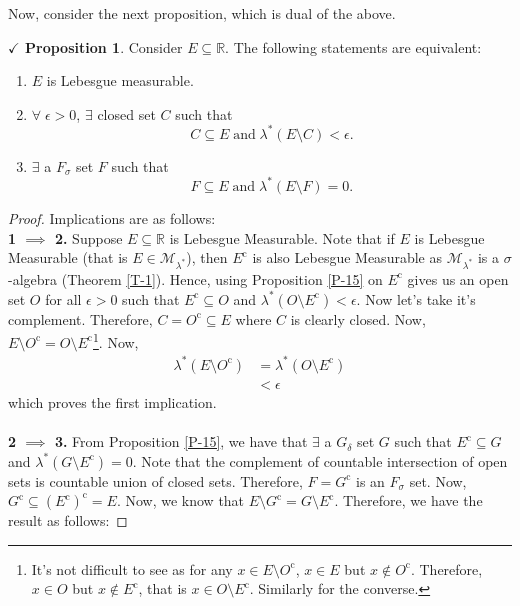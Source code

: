 \documentclass{article}
\theoremstyle{definition}
\theoremstyle{remark}
\theoremstyle{definition}
\theoremstyle{definition}
\newtheorem{proposition}{$\checkmark$ Proposition}
\theoremstyle{definition}
\newcommand{\R}{\mathbb{R}}
\newcommand{\comp}[1]{#1^{\text{c}}}
\newcommand{\lom}[1]{\lambda^*\left (#1\right )}
\newcommand{\set}[1]{\mathscr{#1}}
\newcommand{\msigm}[1]{\set{M}_{#1}}
\begin{document}
Now, consider the next proposition, which is dual of the above.
\begin{proposition}
	Consider $ E \subseteq \R$. The following statements are equivalent:
	\begin{enumerate}
		\item {$ E $ is Lebesgue measurable.}
		\item {$ \forall \;\epsilon >0$, $ \exists  $ closed set $ C $ such that 
			\[C\subseteq E\;\text{and}\;\lom{E\setminus C} < \epsilon.\]	
		}
		\item {$ \exists $ a $ F_\sigma $ set $ F $ such that
			\[F\subseteq E\;\text{and}\;\lom{E\setminus F} = 0.\]
		}
	\end{enumerate}
\end{proposition}
\begin{proof}
	Implications are as follows:\\
	\textbf{1 $ \implies  $ 2.} Suppose $ E \subseteq \R$ is Lebesgue Measurable. Note that if $ E $ is Lebesgue Measurable (that is $ E \in \msigm{\lambda^*} $), then $ \comp{E} $ is also Lebesgue Measurable as $ \msigm{\lambda^*} $ is a $ \sigma $-algebra (Theorem \ref{T-1}). Hence, using Proposition \ref{P-15} on $ \comp{E} $ gives us an open set $ O $ for all $ \epsilon>0 $ such that $ \comp{E}\subseteq O $ and $ \lom{O\setminus \comp{E}} < \epsilon $. Now let's take it's complement. Therefore, $ C = \comp{O} \subseteq E $ where $ C $ is clearly closed. Now, $ E\setminus \comp{O} = O \setminus\comp{E}$\footnote{It's not difficult to see as for any $ x\in E\setminus \comp{O} $, $ x\in E $ but $x\notin \comp{O}  $. Therefore, $ x\in O $ but $x \notin \comp{E} $, that is $ x\in O\setminus \comp{E}$. Similarly for the converse.}. Now, 
	\begin{equation*}
		\begin{split}
			\lom{E\setminus \comp{O}} &= \lom{O\setminus \comp{E}}\\
			&< \epsilon
		\end{split}
	\end{equation*}
which proves the first implication.\\\\
\textbf{2 $ \implies $ 3.} From Proposition \ref{P-15}, we have that $ \exists$ a $ G_\delta $ set $ G $ such that $ \comp{E} \subseteq G $ and $ \lom{G\setminus \comp{E}} =0 $. Note that the complement of countable intersection of open sets is countable union of closed sets. Therefore, $ F =\comp{G} $ is an $ F_\sigma $ set. Now, $ \comp{G} \subseteq \comp{(\comp{E})} = E $. Now, we know that $ E\setminus \comp{G} = G\setminus \comp{E}$. Therefore, we have the result as follows:

\end{proof}
\end{document}
